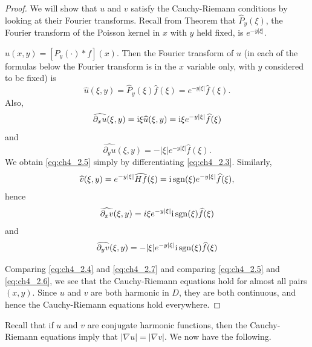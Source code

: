 \begin{proof}
We will show that $u$ and $v$ satisfy the Cauchy-Riemann conditions by looking at their Fourier transforms. Recall from Theorem  that $\widehat{P}_y(\xi)$, the Fourier transform of the Poisson kernel in $x$ with $y$ held fixed, is $e^{-y|\xi|}$.

$u(x,y) = [P_y(\cdot) * f](x)$. Then the Fourier transform of $u$ (in each of the formulas below the Fourier transform is in the $x$ variable only, with $y$ considered to be fixed) is
\begin{equation}\label{eq:ch4_2.3}
    \widehat{u}(\xi,y) = \widehat{P}_y(\xi)\widehat{f}(\xi) = e^{-y|\xi|}\widehat{f}(\xi).
\end{equation}
Also,
\begin{equation}\label{eq:ch4_2.4}
    \widehat{\partial_x u}(\xi,y) = \mathrm{i}\xi\widehat{u}(\xi,y) = \mathrm{i}\xi e^{-y|\xi|}\widehat{f}(\xi)
\end{equation}
and
\begin{equation}\label{eq:ch4_2.5}
    \widehat{\partial_y u}(\xi,y) = -|\xi|e^{-y|\xi|}\widehat{f}(\xi).
\end{equation}
We obtain \eqref{eq:ch4_2.5} simply by differentiating \eqref{eq:ch4_2.3}. Similarly,
\[
    \widehat{v}(\xi,y) = e^{-y|\xi|}\widehat{Hf}(\xi) = \mathrm{i}\operatorname{sgn}(\xi)e^{-y|\xi|}\widehat{f}(\xi),
\]
hence
\begin{equation}\label{eq:ch4_2.6}
    \widehat{\partial_x v}(\xi,y) = i\xi e^{-y|\xi|}\mathrm{i}\operatorname{sgn}(\xi)\widehat{f}(\xi)
\end{equation}
and
\begin{equation}\label{eq:ch4_2.7}
    \widehat{\partial_y v}(\xi,y) = -|\xi|e^{-y|\xi|}\mathrm{i}\operatorname{sgn}(\xi)\widehat{f}(\xi)
\end{equation}

Comparing \eqref{eq:ch4_2.4} and \eqref{eq:ch4_2.7} and comparing \eqref{eq:ch4_2.5} and \eqref{eq:ch4_2.6}, we see that the Cauchy-Riemann equations hold for almost all pairs $(x,y)$. Since $u$ and $v$ are both harmonic in $D$, they are both continuous, and hence the Cauchy-Riemann equations hold everywhere.
\end{proof}


Recall that if $u$ and $v$ are conjugate harmonic functions, then the Cauchy-Riemann equations imply that $|\nabla u| = |\nabla v|$. We now have the following.


